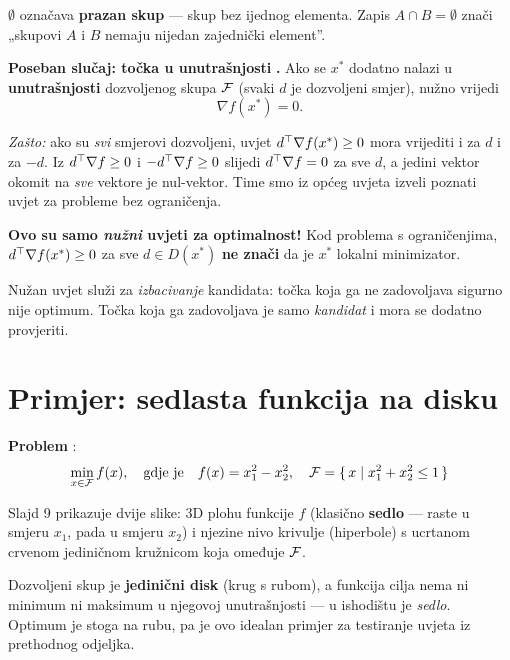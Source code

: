 \begin{napomena}
$\emptyset$ označava \textbf{prazan skup} --- skup bez ijednog elementa. Zapis
$A \cap B = \emptyset$ znači „skupovi $A$ i $B$ nemaju nijedan zajednički
element”.
\end{napomena}

\textbf{Poseban slučaj: točka u unutrašnjosti} \textbf{.} Ako se $x^{*}$
dodatno nalazi u \textbf{unutrašnjosti} dozvoljenog skupa $\mathcal{F}$ (svaki $d$ je
dozvoljeni smjer), nužno vrijedi
\[
\nabla f(x^{*}) = 0.
\]

\emph{Zašto:} ako su \emph{svi} smjerovi dozvoljeni, uvjet
$d^{\top}\nabla f(x^{*}) \ge 0$ mora vrijediti i za $d$ i za $-d$. Iz
$d^{\top}\nabla f \ge 0$ i $-d^{\top}\nabla f \ge 0$ slijedi $d^{\top}\nabla f = 0$ za sve $d$,
a jedini vektor okomit na \emph{sve} vektore je nul-vektor. Time smo iz općeg
uvjeta izveli poznati uvjet za probleme bez ograničenja.

\begin{napomena}
\textbf{Ovo su samo \emph{nužni} uvjeti za optimalnost!} Kod problema s
ograničenjima, $d^{\top}\nabla f(x^{*}) \ge 0$ za sve $d \in D(x^{*})$ \textbf{ne
znači} da je $x^{*}$ lokalni minimizator.

Nužan uvjet služi za \emph{izbacivanje} kandidata: točka koja ga ne zadovoljava
sigurno nije optimum. Točka koja ga zadovoljava je samo \emph{kandidat} i mora
se dodatno provjeriti.
\end{napomena}

\section{Primjer: sedlasta funkcija na disku}
\label{sec:primjer-sedlo}

\textbf{Problem} :
\[
\min_{x\in\mathcal{F}} f(x), \quad\text{gdje je}\quad
f(x) = x_1^2 - x_2^2, \quad
\mathcal{F} = \{\, x \mid x_1^2 + x_2^2 \le 1 \,\}
\]

Slajd 9 prikazuje dvije slike: 3D plohu funkcije $f$ (klasično \textbf{sedlo}
--- raste u smjeru $x_1$, pada u smjeru $x_2$) i njezine nivo krivulje
(hiperbole) s ucrtanom crvenom jediničnom kružnicom koja omeđuje $\mathcal{F}$.

Dozvoljeni skup je \textbf{jedinični disk} (krug s rubom), a funkcija cilja nema
ni minimum ni maksimum u njegovoj unutrašnjosti --- u ishodištu je
\emph{sedlo}. Optimum je stoga na rubu, pa je ovo idealan primjer za testiranje
uvjeta iz prethodnog odjeljka.

